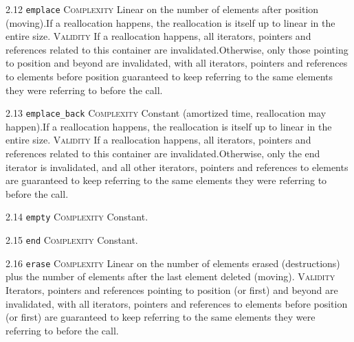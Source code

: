 \noindent\textcolor{corange}{2.12 \texttt{emplace}} \textsc{Complexity} Linear on the number of elements after position (moving).If a reallocation happens, the reallocation is itself up to linear in the entire size. \textsc{Validity} If a reallocation happens, all iterators, pointers and references related to this container are invalidated.Otherwise, only those pointing to position and beyond are invalidated, with all iterators, pointers and references to elements before position guaranteed to keep referring to the same elements they were referring to before the call.\vspace{0.5em}

\noindent\textcolor{corange}{2.13 \texttt{emplace\_back}} \textsc{Complexity} Constant (amortized time, reallocation may happen).If a reallocation happens, the reallocation is itself up to linear in the entire size. \textsc{Validity} If a reallocation happens, all iterators, pointers and references related to this container are invalidated.Otherwise, only the end iterator is invalidated, and all other iterators, pointers and references to elements are guaranteed to keep referring to the same elements they were referring to before the call.\vspace{0.5em}

\noindent\textcolor{cgreen}{2.14 \texttt{empty}} \textsc{Complexity} Constant. \vspace{0.5em}

\noindent\textcolor{cgreen}{2.15 \texttt{end}} \textsc{Complexity} Constant. \vspace{0.5em}

\noindent\textcolor{corange}{2.16 \texttt{erase}} \textsc{Complexity} Linear on the number of elements erased (destructions) plus the number of elements after the last element deleted (moving). \textsc{Validity} Iterators, pointers and references pointing to position (or first) and beyond are invalidated, with all iterators, pointers and references to elements before position (or first) are guaranteed to keep referring to the same elements they were referring to before the call.\vspace{0.5em}

